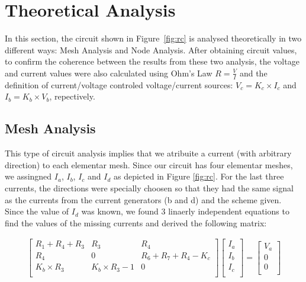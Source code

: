 \section{Theoretical Analysis}
\label{sec:analysis}

In this section, the circuit shown in Figure~\ref{fig:rc} is analysed
theoretically in two different ways: Mesh Analysis and Node Analysis. After obtaining circuit values, to confirm the coherence between the results from these two analysis,
the voltage and current values were also calculated using Ohm's Law $R = \frac{V}{I}$ and the definition of current/voltage controled voltage/current sources: 
$V_c = K_c \times I_c$ and $I_b = K_b \times V_b$, repectively.


\subsection{Mesh Analysis}
This type of circuit analysis implies that we atribuite a current (with arbitrary direction) to each elementar mesh. 
Since our circuit has four elementar meshes, we assingned $I_a$, $I_b$, $I_c$ and $I_d$ as depicted in Figure \ref{fig:rc}. 
For the last three currents, the directions were specially choosen so that they had the same signal as the currents from the 
current generators (b and d) and the scheme given. \\
Since the value of $I_d$ was known, we found 3 linaerly independent equations to find the values of the missing currents 
and derived the following matrix:

\begin{gather}
    \begin{bmatrix}
       R_1 + R_4 + R_3 & R_3 & R_4 \\
       R_4 & 0 & R_6 + R_7 + R_4 - K_c \\
       K_b \times R_3 & K_b \times R_3 - 1 & 0 \\
    \end{bmatrix}
    \begin{bmatrix}
        I_a \\
        I_b \\
        I_c \\
    \end{bmatrix}
    =
    \begin{bmatrix}
        V_a \\
        0 \\
        0 \\
    \end{bmatrix}
\end{gather}

